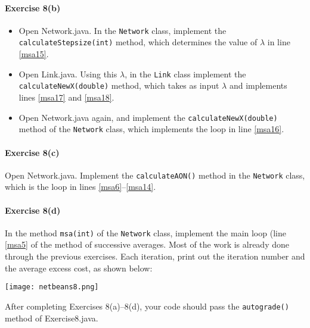 \documentclass[11pt]{article}
\begin{document}
\paragraph*{Exercise 8(b)} 
\begin{itemize}
	\item Open Network.java. In the \texttt{Network} class, implement the \texttt{calculateStepsize(int)} method, which determines the value of $\lambda$ in line \ref{msa15}. 
	
	\item Open Link.java. Using this $\lambda$, in the \texttt{Link} class implement the \texttt{calculateNewX(double)} method, which takes as input $\lambda$ and implements lines \ref{msa17} and \ref{msa18}. 
	
	\item Open Network.java again, and implement the \texttt{calculateNewX(double)} method of the \texttt{Network} class, which implements the loop in line \ref{msa16}. 
\end{itemize}



\paragraph*{Exercise 8(c)} Open Network.java. Implement the \texttt{calculateAON()} method in the \texttt{Network} class, which is the loop in lines \ref{msa6}--\ref{msa14}. 

\paragraph*{Exercise 8(d)} In the method \texttt{msa(int)} of the \texttt{Network} class, implement the main loop (line \ref{msa5} of the method of successive averages. Most of the work is already done through the previous exercises. Each iteration, print out the iteration number and the average excess cost, as shown below:

\begin{center}
	\texttt{[image: netbeans8.png]}
\end{center}








	

	
	\noindent
	After completing Exercises 8(a)--8(d), your code should pass the \texttt{autograde()} method of Exercise8.java. 
	
\end{document}
